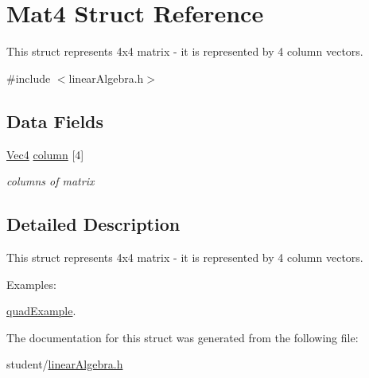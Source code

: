 \hypertarget{structMat4}{}\section{Mat4 Struct Reference}
\label{structMat4}


This struct represents 4x4 matrix -\/ it is represented by 4 column vectors.  




{\ttfamily \#include $<$linear\+Algebra.\+h$>$}

\subsection*{Data Fields}
\begin{DoxyCompactItemize}
\item 
\hypertarget{structMat4_a89c6922a5ca3584062e9841090709592}{}\hyperlink{structVec4}{Vec4} \hyperlink{structMat4_a89c6922a5ca3584062e9841090709592}{column} \mbox{[}4\mbox{]}\label{structMat4_a89c6922a5ca3584062e9841090709592}

\begin{DoxyCompactList}\small\item\em columns of matrix \end{DoxyCompactList}\end{DoxyCompactItemize}


\subsection{Detailed Description}
This struct represents 4x4 matrix -\/ it is represented by 4 column vectors. \begin{Desc}
\item[Examples\+: ]\par
\hyperlink{quadExample-example}{quad\+Example}.\end{Desc}


The documentation for this struct was generated from the following file\+:\begin{DoxyCompactItemize}
\item 
student/\hyperlink{linearAlgebra_8h}{linear\+Algebra.\+h}\end{DoxyCompactItemize}

